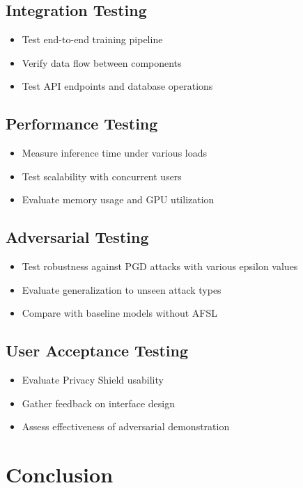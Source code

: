 \documentclass[a4paper,12pt]{article}
\begin{document}
\subsection{Integration Testing}
\begin{itemize}
    \item Test end-to-end training pipeline
    \item Verify data flow between components
    \item Test API endpoints and database operations
\end{itemize}

\subsection{Performance Testing}
\begin{itemize}
    \item Measure inference time under various loads
    \item Test scalability with concurrent users
    \item Evaluate memory usage and GPU utilization
\end{itemize}

\subsection{Adversarial Testing}
\begin{itemize}
    \item Test robustness against PGD attacks with various epsilon values
    \item Evaluate generalization to unseen attack types
    \item Compare with baseline models without AFSL
\end{itemize}

\subsection{User Acceptance Testing}
\begin{itemize}
    \item Evaluate Privacy Shield usability
    \item Gather feedback on interface design
    \item Assess effectiveness of adversarial demonstration
\end{itemize}

\newpage
\section{Conclusion}
\end{document}
